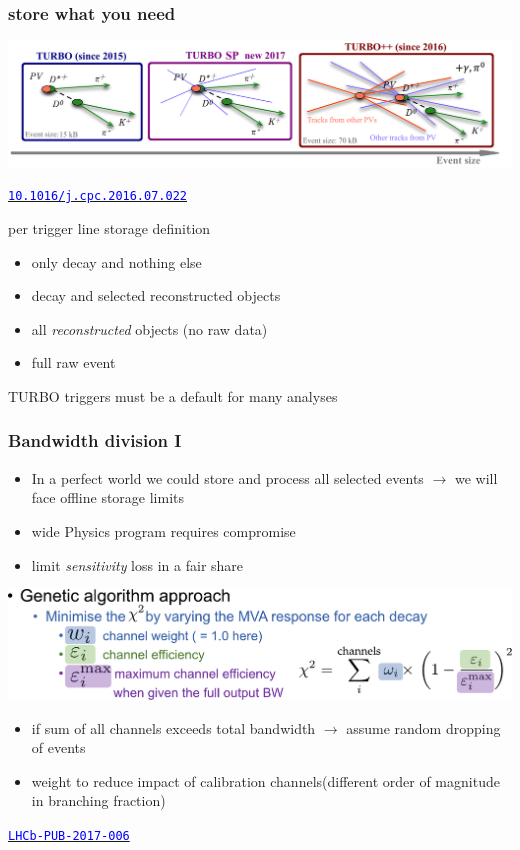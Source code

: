\documentclass[table,xcolor=dvipsnames,professionalfonts]{beamer}
\newcommand{\myhref}[2]{\href{#1}{\footnotesize{\textcolor{blue}{\texttt{#2}}}}}
\begin{document}
\begin{frame}
  \frametitle{store what you need}
  \includegraphics[width=\textwidth]{./turbosp.png}

  \myhref{http://dx.doi.org/10.1016/j.cpc.2016.07.022}{10.1016/j.cpc.2016.07.022}
  
  \begin{block}{per trigger line storage definition}
  \begin{itemize}
      \item only decay and nothing else
      \item decay and selected reconstructed objects
      \item all \emph{reconstructed} objects (no raw data)
      \item full raw event
  \end{itemize}
  TURBO triggers must be a default for many analyses
  \end{block}
\end{frame}

\begin{frame}
  \frametitle{Bandwidth division I}
  \begin{itemize}
    \item In a perfect world we could store and process all selected events
      \newline$\rightarrow$ we will face offline storage limits
    \item wide Physics program requires compromise
    \item limit \emph{sensitivity} loss in a fair share
  \end{itemize}

  \begin{block}{}
    \includegraphics[width=\textwidth]{./BW.pdf}
    \begin{itemize}
        \item if sum of all channels exceeds total bandwidth \newline$\rightarrow$ assume random dropping of events
        \item weight to reduce impact of calibration channels\newline (different order of magnitude in branching fraction)
    \end{itemize}
  \end{block}

  \vspace{-1em}
  \myhref{https://cds.cern.ch/record/2244313}{LHCb-PUB-2017-006}
\end{frame}
\end{document}
